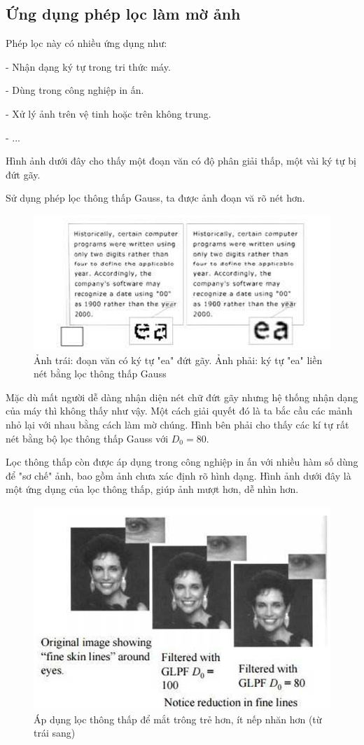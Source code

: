 \documentclass[12pt,a4paper]{report}
\numberwithin{equation}{section}
\theoremstyle{definition} %
\begin{document}
\subsection{Ứng dụng phép lọc làm mờ ảnh}

Phép lọc này có nhiều ứng dụng như:

- Nhận dạng ký tự trong tri thức máy.

- Dùng trong công nghiệp in ấn.

- Xử lý ảnh trên vệ tinh hoặc trên không trung.

- ...

Hình ảnh dưới đây cho thấy một đoạn văn có độ phân giải thấp, một vài ký tự bị đứt gãy. 

Sử dụng phép lọc thông thấp Gauss, ta được ảnh đoạn vă rõ nét hơn.
\begin{figure}[H]
	\centering
	\includegraphics[width=0.9\linewidth]{img/ungdungmoanh1.png}
	\caption{Ảnh trái:  đoạn văn có ký tự "ea" đứt gãy. Ảnh phải: ký tự "ea" liền nét bằng lọc thông thấp Gauss}
\end{figure}
Mặc dù mất người dễ dàng nhận diện nét chữ đứt gãy nhưng hệ thống nhận dạng của máy thì không thấy như vậy. Một cách giải quyết đó là ta bắc cầu các mảnh nhỏ lại với nhau bằng cách làm mờ chúng. Hình bên phải cho thấy các kí tự rất nét bằng bộ lọc thông thấp Gauss với $D_0 = 80$.

Lọc thông thấp còn được áp dụng trong công nghiệp in ấn với nhiều hàm số dùng để "sơ chế" ảnh, bao gồm ảnh chưa xác định rõ hình dạng. Hình ảnh dưới đây là một ứng dụng của lọc thông thấp, giúp ảnh mượt hơn, dễ nhìn hơn.

\begin{figure}[H]
\centering
\includegraphics[width=0.88\linewidth]{img/ungdungmoanh2.png}
\caption{Áp dụng lọc thông thấp để mắt trông trẻ hơn, ít nếp nhăn hơn (từ trái sang)}
\end{figure}
\end{document}
